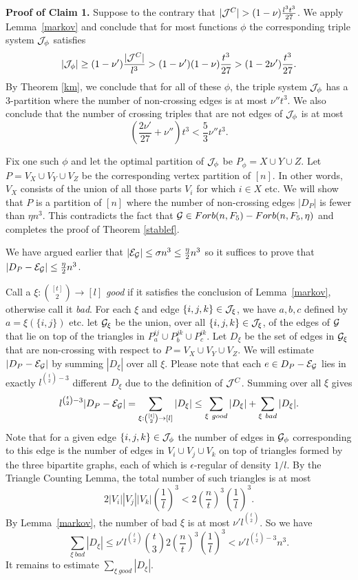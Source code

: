 \documentclass[11pt]{article}
\begin{document}
{\bf Proof of Claim 1.} Suppose to the contrary that $|\cJ^C|>
(1-\nu)\frac{l^3 t^3}{27}$.
 We  apply  Lemma~\ref{markov}  and conclude that for most functions $\phi$ the corresponding triple
  system ${\cal J}_{\phi}$ satisfies
$$|{\cal J}_{\phi}| \ge (1-\nu')\frac{|{\cal J}^C|}{l^3} > (1-\nu')(1-\nu)\frac{t^3}{27}>(1-2\nu')\frac{t^3}{27}.$$
By  Theorem \ref{km}, we conclude that for all of these $\phi$, the
triple system ${\cal J}_{\phi}$ has a $3$-partition where the number of
non-crossing edges is at most  $\nu'' t^3$.  We also conclude that
the number of crossing triples that are not edges of ${\cal J}_{\phi}$ is
at most
\begin{equation} \label{nu''} \left(\frac{2\nu'}{27}+\nu''\right)t^3<\frac{5}{3}\nu''t^3. \end{equation}

Fix one such $\phi$ and let the optimal partition of ${\cal J}_{\phi}$  be $P_{\phi}=X \cup Y \cup Z$.
 Let $P=V_X \cup V_Y \cup V_Z$ be the corresponding vertex partition of $[n]$.
 In other words, $V_X$ consists of the union of all those parts $V_i$ for which $i \in X$ etc.
   We will show that $P$ is a partition of $[n]$ where the number of
   non-crossing edges $|D_P|$ is fewer than $\eta n^3$.  This contradicts the fact that
    ${{\cal G}} \in Forb(n,F_5)-Forb(n, F_5, \eta)$ and completes the proof of Theorem \ref{stablef}.

We have  argued earlier  that $|{\cal E}_{{{\cal G}}}|\le \sigma n^3 \le
\frac{\eta}{2}n^3$ so it suffices to prove that $|D_P -{\cal E}_{{{\cal G}}}|\le
\frac{\eta}{2}n^3$.

Call a $\xi: {[t]\choose 2} \rightarrow [l]$ {\it good} if it satisfies the
conclusion of Lemma~\ref{markov}, otherwise call it {\it bad}. For
each $\xi$ and edge $\{i,j,k\} \in {\cal J}_{\xi}$, we have $a,b,c$
defined by $a=\xi(\{i,j\})$ etc. let ${{\cal G}}_{\xi}$ be the union, over
all $\{i,j,k\} \in {\cal J}_{\xi}$, of the edges of ${{\cal G}}$ that lie on top
of the triangles in $P_{a}^{ij} \cup P_{b}^{jk} \cup P_{c}^{ik}$.
Let $D_{\xi}$ be the set of edges in ${{\cal G}}_{\xi}$ that are
non-crossing with respect to $P=V_X \cup V_Y \cup V_Z$. We will
estimate $|D_P-{\cal E}_{{{\cal G}}}|$ by summing  $|D_{\xi}|$ over all $\xi$.
Please note that each $e\in D_P-{\cal E}_{{{\cal G}}}$  lies in exactly  $l^{{t
\choose 2}-3}$ different $D_{\xi}$ due to the definition of ${\cal J}^C$.
Summing over all $\xi$ gives
$$l^{{t \choose 2}-3} |D_P-{\cal E}_{{{\cal G}}}| =\sum_{\xi:{[t]\choose 2} \rightarrow [l]}|D_{\xi}|\le \sum_{\xi\  good} |D_{\xi}|
+\sum_{\xi\  bad} |D_{\xi}|.$$ Note that for a given edge $\{i,j,k\}
\in {\cal J}_{\phi}$ the number of edges in ${{\cal G}}_{\phi}$ corresponding to
this edge is the number of edges in $V_i \cup V_j \cup V_k$ on top
of triangles formed by the three bipartite graphs, each of which is
$\epsilon$-regular of density $1/l$.  By the Triangle Counting
Lemma, the total number of such triangles is at most
$$2|V_i||V_j||V_k|\left(\frac1l\right)^3<2\left(\frac{n}{t}\right)^3 \left(\frac1l\right)^3.$$
By Lemma~\ref{markov}, the number of bad $\xi$ is at most $\nu'
l^{{t\choose 2}}$. So we have
$$\sum_{\xi\  bad} |D_{\xi}|\le \nu' l^{{t\choose 2}}{t \choose 3}2
\left(\frac{n}{t}\right)^3 \left(\frac1l\right)^3<\nu'l^{{t\choose
2}-3}n^3.$$ It remains to estimate $\sum_{\xi\  good} |D_{\xi}|$.
\end{document}
